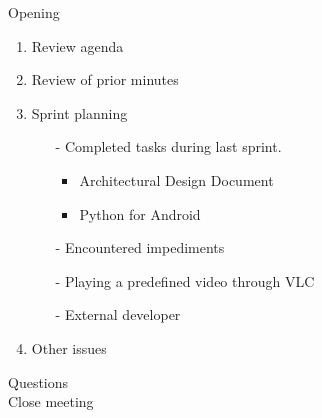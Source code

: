 \documentclass[pdftex, 12pt, a4paper]{report}
\begin{document}
\pagestyle{fancy}

Opening

\begin{enumerate}
\item Review agenda			
\item Review of prior minutes
\item Sprint planning
\begin{enumerate}
\item[-] Completed tasks during last sprint.
	\begin{itemize}
	\item Architectural Design Document
	\item Python for Android
	\end{itemize}
\item[-] Encountered impediments
\item[-] Playing a predefined video through VLC
\item[-] External developer
\end{enumerate}
\item Other issues
\end{enumerate}

Questions\\

Close meeting
\end{document}

